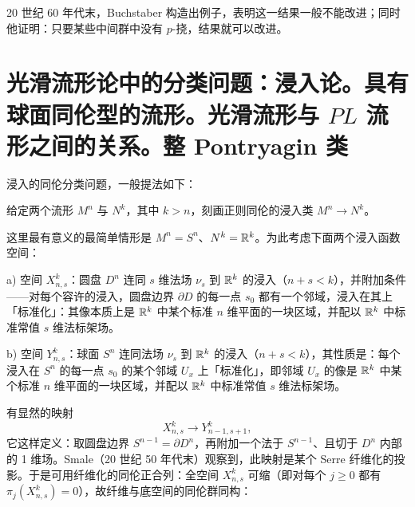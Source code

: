 20 世纪 60 年代末，Buchstaber 构造出例子，表明这一结果一般不能改进；同时他证明：只要某些中间群中没有 $p$-挠，结果就可以改进。

\section[光滑流形论中的分类问题。 整 Pontryagin 类]{光滑流形论中的分类问题：浸入论。具有球面同伦型的流形。光滑流形与 $PL$ 流形之间的关系。整 Pontryagin 类}

浸入的同伦分类问题，一般提法如下：

给定两个流形 $M^n$ 与 $N^k$，其中 $k>n$，刻画正则同伦的浸入类 $M^n\to N^k$。

这里最有意义的最简单情形是 $M^n=S^n$、$N^k=\mathbb{R}^k$。为此考虑下面两个浸入函数空间：

a) 空间 $X^k_{n,s}$：圆盘 $D^n$ 连同 $s$ 维法场 $\nu_s$ 到 $\mathbb{R}^k$ 的浸入（$n+s<k$），并附加条件——对每个容许的浸入，圆盘边界 $\partial D$ 的每一点 $s_0$ 都有一个邻域，浸入在其上「标准化」：其像本质上是 $\mathbb{R}^k$ 中某个标准 $n$ 维平面的一块区域，并配以 $\mathbb{R}^k$ 中标准常值 $s$ 维法标架场。

b) 空间 $Y^k_{n,s}$：球面 $S^n$ 连同法场 $\nu_s$ 到 $\mathbb{R}^k$ 的浸入（$n+s<k$），其性质是：每个浸入在 $S^n$ 的每一点 $s_0$ 的某个邻域 $U_x$ 上「标准化」，即邻域 $U_x$ 的像是 $\mathbb{R}^k$ 中某个标准 $n$ 维平面的一块区域，并配以 $\mathbb{R}^k$ 中标准常值 $s$ 维法标架场。


有显然的映射
\[
X^k_{n,s}\longrightarrow Y^k_{n-1,s+1},
\]
它这样定义：取圆盘边界 $S^{n-1}=\partial D^n$，再附加一个法于 $S^{n-1}$、且切于 $D^n$ 内部的 1 维场。Smale（20 世纪 50 年代末）观察到，此映射是某个 Serre 纤维化的投影。于是可用纤维化的同伦正合列：全空间 $X^k_{n,s}$ 可缩（即对每个 $j\ge0$ 都有 $\pi_j(X^k_{n,s})=0$），故纤维与底空间的同伦群同构：

